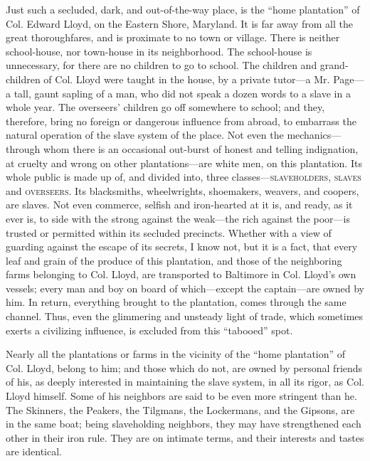 Just such a secluded, dark, and out-of-the-way place, is the ``home
plantation'' of Col. Edward Lloyd, on the Eastern Shore, Maryland. It is
far away from all the great thoroughfares, and is proximate to no town
or village. There is neither school-house, nor town-house in its
neighborhood. The school-house is unnecessary, for there are no children
to go to school. The children and grand-children of Col. Lloyd were
taught in the house, by a private tutor---a Mr. Page---a tall, gaunt
sapling of a man, who did not speak a dozen words to a slave in a whole
year. The overseers' children go off somewhere to school; and they,
therefore, bring no foreign or dangerous influence from abroad, to
embarrass the natural operation of the slave system of the place. Not
even the mechanics---through whom there is an occasional out-burst of
honest and telling indignation, at cruelty and wrong on other
plantations---are white men, on this plantation. Its whole public is
made up of, and divided into, three classes---\textsc{slaveholders},
\textsc{slaves} and \textsc{overseers}. Its blacksmiths, wheelwrights,
shoemakers, weavers, and coopers, are slaves. Not even commerce, selfish
and iron-hearted at it is, and ready, as it ever is, to side with the
strong against the {}weak---the rich against the poor---is trusted or
permitted within its secluded precincts. Whether with a view of guarding
against the escape of its secrets, I know not, but it is a fact, that
every leaf and grain of the produce of this plantation, and those of the
neighboring farms belonging to Col. Lloyd, are transported to Baltimore
in Col. Lloyd's own vessels; every man and boy on board of
which---except the captain---are owned by him. In return, everything
brought to the plantation, comes through the same channel. Thus, even
the glimmering and unsteady light of trade, which sometimes exerts a
civilizing influence, is excluded from this ``tabooed'' spot.

Nearly all the plantations or farms in the vicinity of the ``home
plantation'' of Col. Lloyd, belong to him; and those which do not, are
owned by personal friends of his, as deeply interested in maintaining
the slave system, in all its rigor, as Col. Lloyd himself. Some of his
neighbors are said to be even more stringent than he. The Skinners, the
Peakers, the Tilgmans, the Lockermans, and the Gipsons, are in the same
boat; being slaveholding neighbors, they may have strengthened each
other in their iron rule. They are on intimate terms, and their
interests and tastes are identical.


